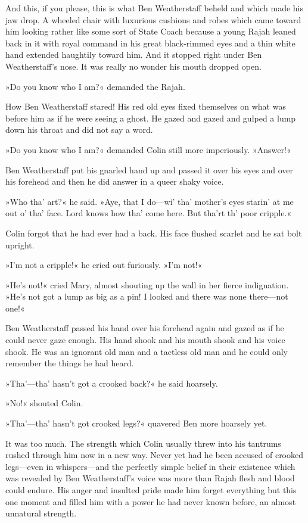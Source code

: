 And this, if you please, this is what Ben Weatherstaff beheld and which made his jaw drop. A wheeled chair with luxurious cushions and robes which came toward him looking rather like some sort of State Coach because a young Rajah leaned back in it with royal command in his great black-rimmed eyes and a thin white hand extended haughtily toward him. And it stopped right under Ben Weatherstaff's nose. It was really no wonder his mouth dropped open.

»Do you know who I am?« demanded the Rajah.

How Ben Weatherstaff stared! His red old eyes fixed themselves on what was before him as if he were seeing a ghost. He gazed and gazed and gulped a lump down his throat and did not say a word.

»Do you know who I am?« demanded Colin still more imperiously. »Answer!«

Ben Weatherstaff put his gnarled hand up and passed it over his eyes and over his forehead and then he did answer in a queer shaky voice.

»Who tha' art?« he said. »Aye, that I do—wi' tha' mother's eyes starin' at me out o' tha' face. Lord knows how tha' come here. But tha'rt th' poor cripple.«

Colin forgot that he had ever had a back. His face flushed scarlet and he sat bolt upright.

»I'm not a cripple!« he cried out furiously. »I'm not!«

»He's not!« cried Mary, almost shouting up the wall in her fierce indignation. »He's not got a lump as big as a pin! I looked and there was none there—not one!«

Ben Weatherstaff passed his hand over his forehead again and gazed as if he could never gaze enough. His hand shook and his mouth shook and his voice shook. He was an ignorant old man and a tactless old man and he could only remember the things he had heard.

»Tha'—tha' hasn't got a crooked back?« he said hoarsely.

»No!« shouted Colin.

»Tha'—tha' hasn't got crooked legs?« quavered Ben more hoarsely yet.

It was too much. The strength which Colin usually threw into his tantrums rushed through him now in a new way. Never yet had he been accused of crooked legs—even in whispers—and the perfectly simple belief in their existence which was revealed by Ben Weatherstaff's voice was more than Rajah flesh and blood could endure. His anger and insulted pride made him forget everything but this one moment and filled him with a power he had never known before, an almost unnatural strength.

